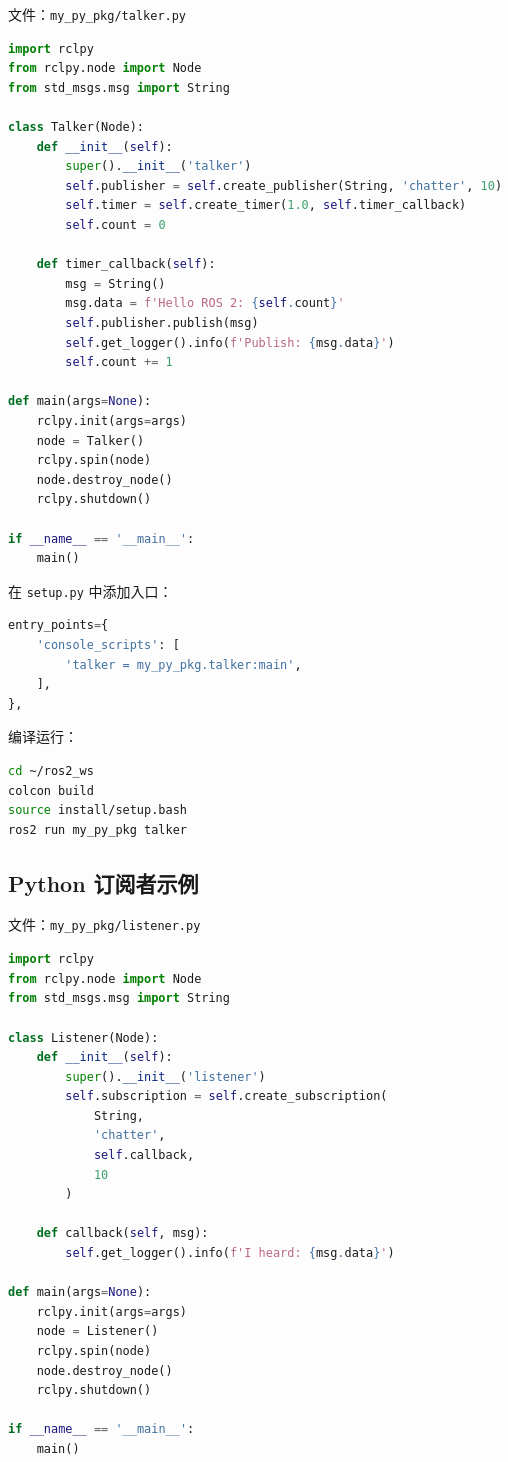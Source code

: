 \documentclass[UTF8,a4paper,12pt]{ctexart}
\begin{document}
文件：\texttt{my\_py\_pkg/talker.py}

\begin{lstlisting}[language=Python]
import rclpy
from rclpy.node import Node
from std_msgs.msg import String

class Talker(Node):
    def __init__(self):
        super().__init__('talker')
        self.publisher = self.create_publisher(String, 'chatter', 10)
        self.timer = self.create_timer(1.0, self.timer_callback)
        self.count = 0

    def timer_callback(self):
        msg = String()
        msg.data = f'Hello ROS 2: {self.count}'
        self.publisher.publish(msg)
        self.get_logger().info(f'Publish: {msg.data}')
        self.count += 1

def main(args=None):
    rclpy.init(args=args)
    node = Talker()
    rclpy.spin(node)
    node.destroy_node()
    rclpy.shutdown()

if __name__ == '__main__':
    main()
\end{lstlisting}

在 \texttt{setup.py} 中添加入口：

\begin{lstlisting}[language=Python]
entry_points={
    'console_scripts': [
        'talker = my_py_pkg.talker:main',
    ],
},
\end{lstlisting}

编译运行：

\begin{lstlisting}[language=bash]
cd ~/ros2_ws
colcon build
source install/setup.bash
ros2 run my_py_pkg talker
\end{lstlisting}

\subsection{Python 订阅者示例}

文件：\texttt{my\_py\_pkg/listener.py}

\begin{lstlisting}[language=Python]
import rclpy
from rclpy.node import Node
from std_msgs.msg import String

class Listener(Node):
    def __init__(self):
        super().__init__('listener')
        self.subscription = self.create_subscription(
            String,
            'chatter',
            self.callback,
            10
        )

    def callback(self, msg):
        self.get_logger().info(f'I heard: {msg.data}')

def main(args=None):
    rclpy.init(args=args)
    node = Listener()
    rclpy.spin(node)
    node.destroy_node()
    rclpy.shutdown()

if __name__ == '__main__':
    main()
\end{lstlisting}
\end{document}
